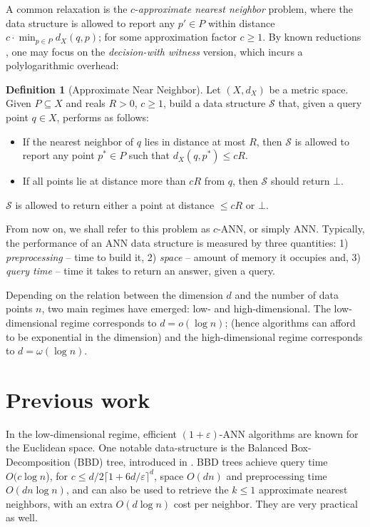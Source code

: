 \documentclass[10pt,a4paper,twoside]{book}
\newcommand{\eps}{\varepsilon}
\theoremstyle{definition}
\newtheorem{definition}{Definition}[chapter]
\theoremstyle{remark}
\begin{document}
A common relaxation is the $c$-\textit{approximate nearest neighbor} problem, where the data structure is allowed to report any $p' \in P$ within distance $c \cdot \min_{p \in P} d_X(q,p)$; for some approximation factor $c \geq 1$. By known reductions \cite{IM98}, one may focus on the \textit{decision-with witness} version, which incurs a polylogarithmic overhead:
\begin{definition}[Approximate Near Neighbor]
Let $(X,d_X)$ be a metric space. Given $P \subseteq X$ and reals $R>0$, $c \geq 1$, build a data structure $\mathcal{S}$ that, given a query point $q \in X$, performs as follows:
\begin{itemize}
\itemsep0em
    \item If the nearest neighbor of $q$ lies in distance at most $R$, then $\mathcal{S}$ is allowed to report any point $p^* \in P$ such that $d_X(q,p^*) \leq cR$.
    \item If all points lie at distance more than $cR$ from $q$, then  $\mathcal{S}$ should return $\bot$.
\end{itemize}
$\mathcal{S}$ is allowed to return either a point at distance $\leq cR$ or $\bot$. 
\end{definition}

From now on, we shall refer to this problem as $c$-ANN, or simply ANN. Typically, the performance of an ANN data structure is measured by three quantities: 1) \textit{preprocessing} -- time to build it, 2) \textit{space} -- amount of memory it occupies and, 3) \textit{query time} -- time it takes to return an answer, given a query.

Depending on the relation between the dimension $d$ and the number of data points $n$, two main regimes have emerged: low- and high-dimensional. The low-dimensional regime corresponds to $ d=o(\log{n})$; (hence algorithms can afford to be exponential in the dimension) and the high-dimensional regime corresponds to $d = \omega(\log n)$.

\section{Previous work} \label{section:prev}

In the low-dimensional regime, efficient $(1{+}\eps)$-ANN algorithms are known for the Euclidean space. One notable data-structure is the Balanced Box-Decomposition (BBD) tree, introduced in \cite{AMNSW98}. BBD trees achieve query time $O(c \log n$), for $c \leq d/2 \lceil 1+6d/ \eps \rceil^d$, space $O(dn)$ and preprocessing time $O(dn \log n)$, and can also be used to retrieve the $k \leq 1 $ approximate nearest neighbors, with an extra $O(d \log n)$ cost per neighbor. They are very practical as well.
\end{document}
